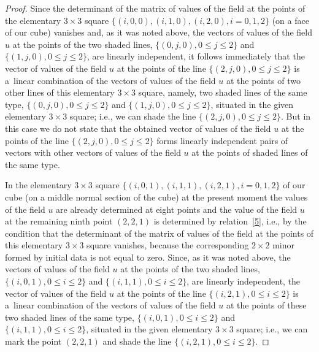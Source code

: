 \documentclass[11pt]{article}
\begin{document}
\begin{proof}
Since the determinant of the matrix of values of the f\/ield at the
points of the elementary $3 \times 3$ square $\{(i, 0, 0), (i, 1,
0), (i, 2, 0), i = 0, 1, 2\}$ (on a face of our cube) vanishes and,
as it was noted above, the vectors of values of the f\/ield $u$ at the
points of the two shaded lines, $\{(0, j, 0), 0 \leq j \leq 2\}$ and
$\{(1, j, 0), 0 \leq j \leq 2\}$, are linearly independent, it
follows immediately that the vector of values of the f\/ield $u$ at
the points of the line $\{(2, j, 0), 0 \leq j \leq 2\}$ is a~linear
combination of the vectors of values of the f\/ield $u$ at the points
of two other lines of this elementary $3 \times 3$ square, namely,
two shaded lines of the same type, $\{(0, j, 0), 0 \leq j \leq 2\}$
and $\{(1, j, 0), 0 \leq j \leq 2\}$, situated in the given
elementary $3 \times 3$ square; i.e., we can shade the line $\{(2,
j, 0), 0 \leq j \leq 2\}$. But in this case we do not state that the
obtained vector of values of the f\/ield $u$ at the points of the line
$\{(2, j, 0), 0 \leq j \leq 2\}$ forms linearly independent pairs of
vectors with other vectors of values of the f\/ield $u$ at the points
of shaded lines of the same type.


In the elementary $3 \times 3$ square $\{(i, 0, 1), (i, 1, 1), (i,
2, 1), i = 0, 1, 2\}$ of our cube (on a middle normal section of the
cube) at the present moment the values of the f\/ield $u$ are already
determined at eight points and the value of the f\/ield $u$ at the
remaining ninth point $(2, 2, 1)$ is determined by relation~\eqref{5},
i.e., by the condition that the determinant of the
matrix of values of the f\/ield at the points of this elementary $3
\times 3$ square vanishes, because the corresponding $2 \times 2$
minor formed by initial data is not equal to zero. Since, as it was
noted above, the vectors of values of the f\/ield $u$ at the points of
the two shaded lines, $\{(i, 0, 1), 0 \leq i \leq 2\}$ and $\{(i, 1,
1), 0 \leq i \leq 2\}$, are linearly independent, the vector of
values of the f\/ield $u$ at the points of the line $\{(i, 2, 1), 0
\leq i \leq 2\}$ is a~linear combination of the vectors of values of
the f\/ield $u$ at the points of these two shaded lines of the same
type, $\{(i, 0, 1), 0 \leq i \leq 2\}$ and $\{(i, 1, 1), 0 \leq i
\leq 2\}$, situated in the given elementary $3 \times 3$ square;
i.e., we can mark the point $(2, 2, 1)$ and shade the line $\{(i, 2,
1), 0 \leq i \leq 2\}$.





\end{proof}
\end{document}
